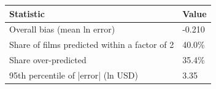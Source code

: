 \begin{tabular}{ll}
\toprule
Statistic & Value \\
\midrule
Overall bias (mean ln error) & -0.210 \\
Share of films predicted within a factor of 2 & 40.0\% \\
Share over-predicted & 35.4\% \\
95th percentile of |error| (ln USD) & 3.35 \\
\bottomrule
\end{tabular}
